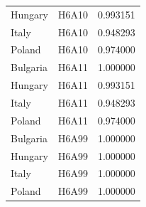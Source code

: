 \begin{tabular}{llr}
Hungary & H6A10 & 0.993151 \\
Italy & H6A10 & 0.948293 \\
Poland & H6A10 & 0.974000 \\
Bulgaria & H6A11 & 1.000000 \\
Hungary & H6A11 & 0.993151 \\
Italy & H6A11 & 0.948293 \\
Poland & H6A11 & 0.974000 \\
Bulgaria & H6A99 & 1.000000 \\
Hungary & H6A99 & 1.000000 \\
Italy & H6A99 & 1.000000 \\
Poland & H6A99 & 1.000000 \\
\bottomrule
\end{tabular}
